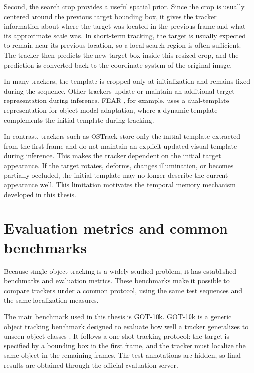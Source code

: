 \documentclass[bachelorthesis]{fer}
\numberwithin{equation}{chapter}
\begin{document}
    Second, the search crop provides a useful spatial prior. Since the crop is usually
    centered around the previous target bounding box, it gives the tracker information about
    where the target was located in the previous frame and what its approximate scale was.
    In short-term tracking, the target is usually expected to remain near its previous
    location, so a local search region is often sufficient. The tracker then predicts the
    new target box inside this resized crop, and the prediction is converted back to the
    coordinate system of the original image.

    In many trackers, the template is cropped only at initialization and remains fixed during
    the sequence. Other trackers update or maintain an additional target representation
    during inference. FEAR \cite{borsuk2022fear}, for example, uses a dual-template representation for object
    model adaptation, where a dynamic template complements the initial template during
    tracking.

    In contrast, trackers such as OSTrack store only the initial template extracted from the
    first frame and do not maintain an explicit updated visual template during inference.
    This makes the tracker dependent on the initial target appearance. If the target rotates,
    deforms, changes illumination, or becomes partially occluded, the initial template may no
    longer describe the current appearance well. This limitation motivates the temporal memory mechanism developed in this thesis.


    \section{Evaluation metrics and common benchmarks}\label{evaluation-metrics-and-common-benchmarks}

    Because single-object tracking is a widely studied problem, it has established
    benchmarks and evaluation metrics. These benchmarks make it possible to compare trackers
    under a common protocol, using the same test sequences and the same localization
    measures.

    The main benchmark used in this thesis is GOT-10k. GOT-10k is a generic object tracking
    benchmark designed to evaluate how well a tracker generalizes to unseen object classes
    \cite{huang2021got10k}. It follows a one-shot tracking protocol: the target is specified by a bounding box
    in the first frame, and the tracker must localize the same object in the remaining
    frames. The test annotations are hidden, so final results are obtained through the
    official evaluation server.
\end{document}
